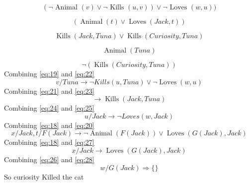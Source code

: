 \documentclass{article}[18pt]
\begin{document}
\begin{equation}\label{eq:19}( \neg \text { Animal } ( v ) \vee \neg \text { Kills } ( u , v ) ) \vee \neg \text { Loves } ( w , u ) )\end{equation}

\begin{equation}\label{eq:20}(\operatorname{Animal}(t)\lor \operatorname{Loves}(Jack,t))\end{equation}

\begin{equation}\label{eq:21}\operatorname{Kills}(Jack,Tuna)\lor \operatorname{Kills}(Curiosity, Tuna)\end{equation}

\begin{equation}\label{eq:22}\operatorname{Animal}(Tuna)\end{equation}

\begin{equation}\label{eq:23}\lnot(\operatorname{Kills}(Curiosity, Tuna))\end{equation}
Combining \eqref{eq:19} and \eqref{eq:22}
\begin{equation}\label{eq:24}v / Tuna \rightarrow \lnot Kills(u, Tuna)\lor \lnot \operatorname{Loves}(w,u)\end{equation}
Combining \eqref{eq:21} and \eqref{eq:23}
\begin{equation}\label{eq:25}\rightarrow \operatorname{Kills}(Jack, Tuna)\end{equation}
Combining \eqref{eq:24} and \eqref{eq:25}
\begin{equation}\label{eq:26}u/Jack \rightarrow \lnot Loves(w,Jack)\end{equation}
Combining \eqref{eq:18} and \eqref{eq:20}
\begin{equation}\label{eq:27}x/Jack, t/F(Jack) \rightarrow \lnot \operatorname{Animal}(F(Jack)) \lor \operatorname{Loves}(G(Jack),Jack)\end{equation}
Combining \eqref{eq:18} and \eqref{eq:27}
\begin{equation}\label{eq:28}x/Jack\rightarrow \operatorname{Loves}(G(Jack),Jack)\end{equation}
Combining \eqref{eq:26} and \eqref{eq:28}
\begin{equation}\label{eq:29}w/G(Jack)\Rightarrow \{\}\end{equation}
So curiosity Killed the cat
\end{document}
